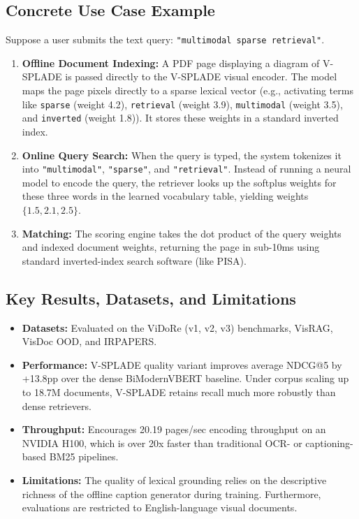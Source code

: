 \documentclass[11pt,a4paper]{article}
\begin{document}
\subsection{Concrete Use Case Example}
Suppose a user submits the text query: \texttt{"multimodal sparse retrieval"}.
\begin{enumerate}
    \item \textbf{Offline Document Indexing:} A PDF page displaying a diagram of V-SPLADE is passed directly to the V-SPLADE visual encoder. The model maps the page pixels directly to a sparse lexical vector (e.g., activating terms like \texttt{sparse} (weight 4.2), \texttt{retrieval} (weight 3.9), \texttt{multimodal} (weight 3.5), and \texttt{inverted} (weight 1.8)). It stores these weights in a standard inverted index.
    \item \textbf{Online Query Search:} When the query is typed, the system tokenizes it into \texttt{"multimodal"}, \texttt{"sparse"}, and \texttt{"retrieval"}. Instead of running a neural model to encode the query, the retriever looks up the softplus weights for these three words in the learned vocabulary table, yielding weights $\{1.5, 2.1, 2.5\}$.
    \item \textbf{Matching:} The scoring engine takes the dot product of the query weights and indexed document weights, returning the page in sub-10ms using standard inverted-index search software (like PISA).
\end{enumerate}

\subsection{Key Results, Datasets, and Limitations}
\begin{itemize}
    \item \textbf{Datasets:} Evaluated on the ViDoRe (v1, v2, v3) benchmarks, VisRAG, VisDoc OOD, and IRPAPERS.
    \item \textbf{Performance:} V-SPLADE quality variant improves average NDCG@5 by +13.8pp over the dense BiModernVBERT baseline. Under corpus scaling up to 18.7M documents, V-SPLADE retains recall much more robustly than dense retrievers.
    \item \textbf{Throughput:} Encourages 20.19 pages/sec encoding throughput on an NVIDIA H100, which is over 20x faster than traditional OCR- or captioning-based BM25 pipelines.
    \item \textbf{Limitations:} The quality of lexical grounding relies on the descriptive richness of the offline caption generator during training. Furthermore, evaluations are restricted to English-language visual documents.
\end{itemize}
\end{document}
